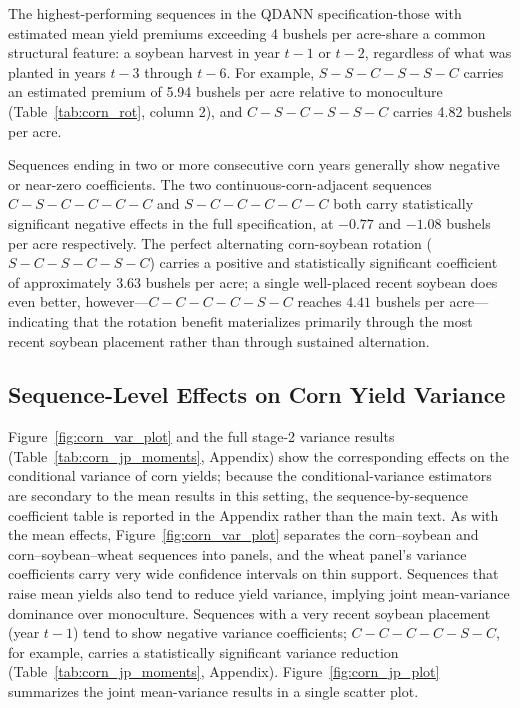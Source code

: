 \documentclass[12pt,letterpaper]{article}
\theoremstyle{remark}
\theoremstyle{remark}
\theoremstyle{plain}
\theoremstyle{definition}
\begin{document}
 
The highest-performing sequences in the QDANN specification-those with estimated mean yield premiums exceeding 4 bushels per acre-share a common structural feature: a soybean harvest in year $t-1$ or $t-2$, regardless of what was planted in years $t-3$ through $t-6$. For example, $S-S-C-S-S-C$ carries an estimated premium of 5.94 bushels per acre relative to monoculture (Table~\ref{tab:corn_rot}, column 2), and $C-S-C-S-S-C$ carries 4.82 bushels per acre.

Sequences ending in two or more consecutive corn years generally show negative or near-zero coefficients. The two continuous-corn-adjacent sequences $C-S-C-C-C-C$ and $S-C-C-C-C-C$ both carry statistically significant negative effects in the full specification, at $-0.77$ and $-1.08$ bushels per acre respectively. The perfect alternating corn-soybean rotation ($S-C-S-C-S-C$) carries a positive and statistically significant coefficient of approximately $3.63$ bushels per acre; a single well-placed recent soybean does even better, however---$C-C-C-C-S-C$ reaches $4.41$ bushels per acre---indicating that the rotation benefit materializes primarily through the most recent soybean placement rather than through sustained alternation.
 
\subsection{\label{subsec:var_effects}Sequence-Level Effects on Corn Yield Variance}
 
Figure~\ref{fig:corn_var_plot} and the full stage-2 variance results (Table~\ref{tab:corn_jp_moments}, Appendix) show the corresponding effects on the conditional variance of corn yields; because the conditional-variance estimators are secondary to the mean results in this setting, the sequence-by-sequence coefficient table is reported in the Appendix rather than the main text. As with the mean effects, Figure~\ref{fig:corn_var_plot} separates the corn--soybean and corn--soybean--wheat sequences into panels, and the wheat panel's variance coefficients carry very wide confidence intervals on thin support. Sequences that raise mean yields also tend to reduce yield variance, implying joint mean-variance dominance over monoculture. Sequences with a very recent soybean placement (year $t-1$) tend to show negative variance coefficients; $C-C-C-C-S-C$, for example, carries a statistically significant variance reduction (Table~\ref{tab:corn_jp_moments}, Appendix). %
Figure~\ref{fig:corn_jp_plot} summarizes the joint mean-variance results in a single scatter plot.
\end{document}

